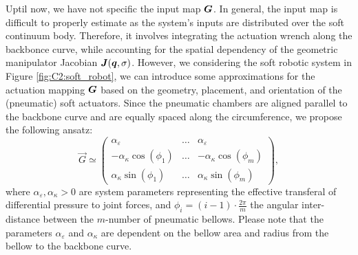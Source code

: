 \begin{asm}  Uptil now, we have not specific the input map ${\boldsymbol{G}}$. In general, the input map is difficult to properly estimate as the system's inputs are distributed over the soft continuum body. Therefore, it involves integrating the actuation wrench along the backbonce curve, while accounting for the spatial dependency of the geometric manipulator Jacobian ${\boldsymbol{J}}({\boldsymbol{q}},\sigma)$. However, we considering the soft robotic system in Figure \ref{fig:C2:soft_robot}, we can introduce some approximations for the actuation mapping $\boldsymbol{G}$ based on the geometry, placement, and orientation of the (pneumatic) soft actuators. Since the pneumatic chambers are aligned parallel to the backbone curve and are equally spaced along the circumference, we propose the following ansatz: 
%
\begin{equation}
\vec{G} \simeq \begin{pmatrix} \alpha_{\varepsilon} & \hdots & \alpha_{\varepsilon} \\ -\alpha_{\kappa} \cos(\phi_1) & \hdots & -\alpha_{\kappa} \cos(\phi_m) \\ \alpha_{\kappa} \sin(\phi_1) & \hdots & \alpha_{\kappa} \sin(\phi_m) \end{pmatrix},
\label{eq:C2:mapping_H}
\end{equation}
%
where $\alpha_{\varepsilon},\alpha_{\kappa} > 0$ are system parameters representing the effective transferal of differential pressure to joint forces, and $\phi_i = (i-1)\cdot\tfrac{2\pi}{m}$ the angular inter-distance between the $m$-number of pneumatic bellows. Please note that the parameters $\alpha_{\varepsilon}$ and $\alpha_{\kappa}$ are dependent on the bellow area and radius from the bellow to the backbone curve.
\end{asm}